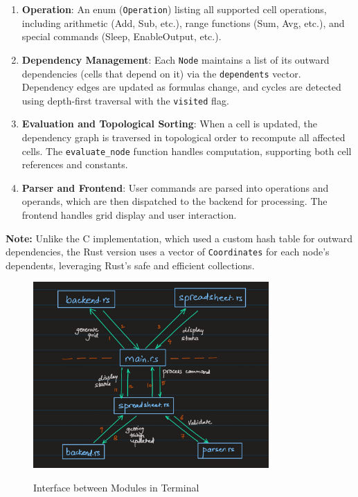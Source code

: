 \documentclass{article}
\begin{document}
\begin{enumerate}
\item \textbf{Operation}: An enum (\texttt{Operation}) listing all supported cell operations, including arithmetic (Add, Sub, etc.), range functions (Sum, Avg, etc.), and special commands (Sleep, EnableOutput, etc.).
\item \textbf{Dependency Management}: Each \texttt{Node} maintains a list of its outward dependencies (cells that depend on it) via the \texttt{dependents} vector. Dependency edges are updated as formulas change, and cycles are detected using depth-first traversal with the \texttt{visited} flag.
\item \textbf{Evaluation and Topological Sorting}: When a cell is updated, the dependency graph is traversed in topological order to recompute all affected cells. The \texttt{evaluate\_node} function handles computation, supporting both cell references and constants.
\item \textbf{Parser and Frontend}: User commands are parsed into operations and operands, which are then dispatched to the backend for processing. The frontend handles grid display and user interaction.
\end{enumerate}

\textbf{Note:} Unlike the C implementation, which used a custom hash table for outward dependencies, the Rust version uses a vector of \texttt{Coordinates} for each node's dependents, leveraging Rust's safe and efficient collections.

\begin{figure}[t]
    \centering
    {{\includegraphics[width=9cm]{terminal.jpg}}}
    \caption{Interface between Modules in Terminal }
    \end{figure}
\end{document}
